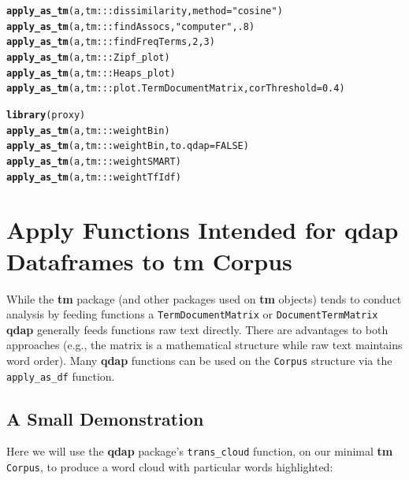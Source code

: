 \documentclass{article}\usepackage[]{graphicx}\usepackage[]{color}
\makeatletter
\newcommand{\hlnum}[1]{\textcolor[rgb]{0.686,0.059,0.569}{#1}}%
\newcommand{\hlstr}[1]{\textcolor[rgb]{0.192,0.494,0.8}{#1}}%
\newcommand{\hlstd}[1]{\textcolor[rgb]{0.345,0.345,0.345}{#1}}%
\newcommand{\hlkwc}[1]{\textcolor[rgb]{0.333,0.667,0.333}{#1}}%
\newcommand{\hlkwd}[1]{\textcolor[rgb]{0.737,0.353,0.396}{\textbf{#1}}}%
\newenvironment{kframe}{%
 \def\at@end@of@kframe{}%
 \ifinner\ifhmode%
  \def\at@end@of@kframe{\end{minipage}}%
  \begin{minipage}{\columnwidth}%
 \fi\fi%
 \def\FrameCommand##1{\hskip\@totalleftmargin \hskip-\fboxsep
 \colorbox{shadecolor}{##1}\hskip-\fboxsep
     \hskip-\linewidth \hskip-\@totalleftmargin \hskip\columnwidth}%
 \MakeFramed {\advance\hsize-\width
   \@totalleftmargin\z@ \linewidth\hsize
   \@setminipage}}%
 {\par\unskip\endMakeFramed%
 \at@end@of@kframe}
\newenvironment{knitrout}{}{} %
\makeatother
\begin{document}
\begin{knitrout}
\color{fgcolor}\begin{kframe}
\begin{alltt}
\hlkwd{apply_as_tm}\hlstd{(a, tm:::dissimilarity,} \hlkwc{method} \hlstd{=} \hlstr{"cosine"}\hlstd{)}
\hlkwd{apply_as_tm}\hlstd{(a, tm:::findAssocs,} \hlstr{"computer"}\hlstd{,} \hlnum{.8}\hlstd{)}
\hlkwd{apply_as_tm}\hlstd{(a, tm:::findFreqTerms,} \hlnum{2}\hlstd{,} \hlnum{3}\hlstd{)}
\hlkwd{apply_as_tm}\hlstd{(a, tm:::Zipf_plot)}
\hlkwd{apply_as_tm}\hlstd{(a, tm:::Heaps_plot)}
\hlkwd{apply_as_tm}\hlstd{(a, tm:::plot.TermDocumentMatrix,} \hlkwc{corThreshold} \hlstd{=} \hlnum{0.4}\hlstd{)}

\hlkwd{library}\hlstd{(proxy)}
\hlkwd{apply_as_tm}\hlstd{(a, tm:::weightBin)}
\hlkwd{apply_as_tm}\hlstd{(a, tm:::weightBin,} \hlkwc{to.qdap} \hlstd{=} \hlnum{FALSE}\hlstd{)}
\hlkwd{apply_as_tm}\hlstd{(a, tm:::weightSMART)}
\hlkwd{apply_as_tm}\hlstd{(a, tm:::weightTfIdf)}
\end{alltt}
\end{kframe}
\end{knitrout}


\section{Apply Functions Intended for qdap Dataframes to tm Corpus}

\hspace{.4cm} While the \textbf{tm} package (and other packages used on \textbf{tm} objects) tends to conduct analysis by feeding functions a \texttt{TermDocumentMatrix} or \texttt{DocumentTermMatrix} \textbf{qdap} generally feeds functions raw text directly.  There are advantages to both approaches (e.g., the matrix is a mathematical structure while raw text maintains word order).  Many \textbf{qdap} functions can be used on the \texttt{Corpus} structure via the \texttt{apply\_as\_df} function.    

\subsection{A Small Demonstration}

\hspace{.4cm} Here we will use the \textbf{qdap} package's \texttt{trans\_cloud} function, on our minimal \textbf{tm} \texttt{Corpus}, to produce a word cloud with particular words highlighted:
\end{document}
